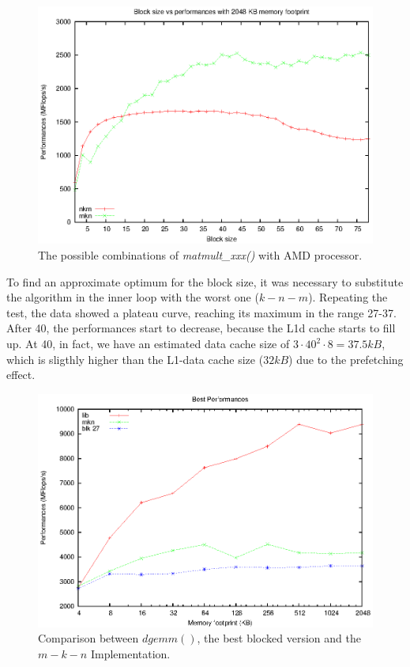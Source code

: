 \begin{figure}[here]
\centering
\includegraphics[width=\textwidth]{results/blkwrong.eps}
\caption{The possible combinations of \emph{matmult\_xxx()} with AMD processor.}
\label{fig:lowk}
\end{figure}

To find an approximate optimum for the block size, it was necessary to substitute the algorithm in the inner loop with the worst one ($k-n-m$). Repeating the test, the data showed a plateau curve, reaching its maximum in the range 27-37. After 40, the performances start to decrease, because the L1d cache starts to fill up. At 40, in fact, we have an estimated data cache size of $3 \cdot 40^2 \cdot 8 = 37.5kB$, which is sligthly higher than the L1-data cache size ($32kB$) due to the prefetching effect.  

\begin{figure}[here]
\centering
\includegraphics[width=\textwidth]{results/3way.eps}
\caption{Comparison between $dgemm()$, the best blocked version and the $m-k-n$ Implementation.}
\label{fig:3way}
\end{figure}
\clearpage


